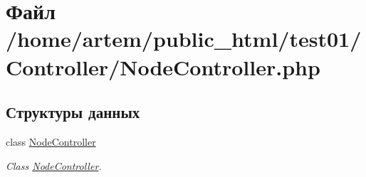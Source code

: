 \hypertarget{_node_controller_8php}{\section{Файл /home/artem/public\-\_\-html/test01/\-Controller/\-Node\-Controller.php}
\label{_node_controller_8php}
}
\subsection*{Структуры данных}
\begin{DoxyCompactItemize}
\item 
class \hyperlink{class_node_controller}{Node\-Controller}
\begin{DoxyCompactList}\small\item\em Class \hyperlink{class_node_controller}{Node\-Controller}. \end{DoxyCompactList}\end{DoxyCompactItemize}
